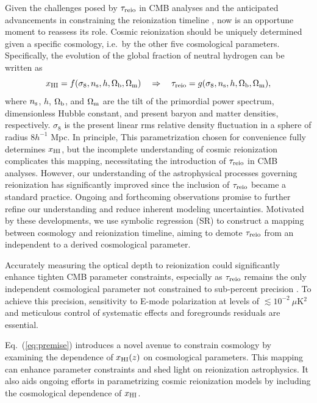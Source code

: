 Given the challenges posed by $\tau_{\mathrm{reio}}$ in CMB analyses and the
anticipated advancements in constraining the reionization timeline
\cite{Montero2021, Hera2022}, now is an opportune moment to reassess its
role.
Cosmic reionization should be uniquely determined given a specific
cosmology, i.e.\ by the other five cosmological parameters.
Specifically, the evolution of the global fraction of neutral hydrogen
can be written as
%
\begin{equation}
\label{eq:premise}
x_{\mathrm{HI}} = f(\sigma_8, n_\mathrm{s}, h, \Omega_\mathrm{b}, \Omega_\mathrm{m}) \quad \Rightarrow \quad
\tau_{\mathrm{reio}} = g(\sigma_8, n_\mathrm{s}, h, \Omega_\mathrm{b}, \Omega_\mathrm{m}),
\end{equation}
%
where $n_\mathrm{s}$, $h$, $\Omega_\mathrm{b}$, and $\Omega_\mathrm{m}$ are the tilt of the
primordial power spectrum, dimensionless Hubble constant, and present
baryon and matter densities, respectively.
$\sigma_8$ is the present linear rms relative density fluctuation in a
sphere of radius $8 h^{-1}$ Mpc.
In principle, This parametrization chosen for convenience fully
determines $x_{\mathrm{HI}}$, but the incomplete understanding of cosmic
reionization complicates this mapping, necessitating the introduction of
$\tau_{\mathrm{reio}}$ in CMB analyses.
However, our understanding of the astrophysical processes governing
reionization has significantly improved
\cite{Gnedin2022, Kannan2022, Murray2020, Fan2023} since the inclusion
of $\tau_{\mathrm{reio}}$ became a standard practice.
Ongoing and forthcoming observations promise to further refine our
understanding and reduce inherent modeling uncertainties.
Motivated by these developments, we use symbolic regression (SR)
\cite{Cranmer2023} to construct a mapping between cosmology and
reionization timeline, aiming to demote $\tau_{\mathrm{reio}}$ from an independent
to a derived cosmological parameter.

Accurately measuring the optical depth to reionization could
significantly enhance tighten CMB parameter constraints, especially as
$\tau_{\mathrm{reio}}$ remains the only independent cosmological parameter not
constrained to sub-percent precision \cite{Planck2020b}.
To achieve this precision, sensitivity to E-mode polarization at levels
of $\lesssim 10^{-2} \ \mu$K$^2$ and meticulous control of systematic
effects and foregrounds residuals are essential.

Eq.~(\ref{eq:premise}) introduces a novel avenue to constrain cosmology
by examining the dependence of $x_{\mathrm{HI}}(z)$ on cosmological parameters.
This mapping can enhance parameter constraints and shed light on
reionization astrophysics.
It also aids ongoing efforts in parametrizing cosmic reionization models
\cite{Trac2018, Trac2022} by including the cosmological dependence of
$x_{\mathrm{HI}}$.


